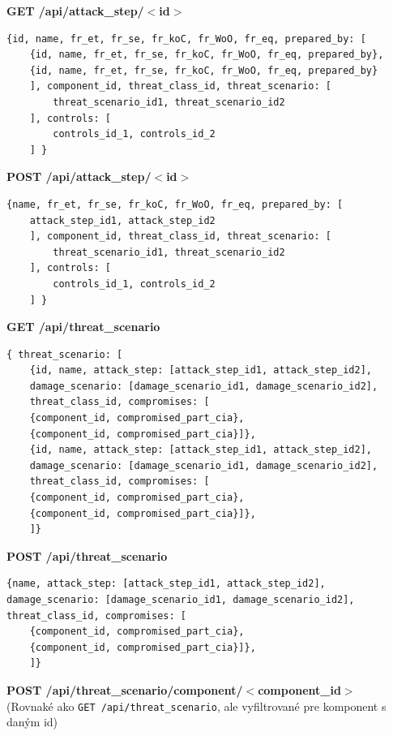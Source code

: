 \documentclass[11pt]{article}
\begin{document}
\vspace{1cm}
\textbf{GET /api/attack\_step/$<$id$>$} 
\begin{verbatim}
{id, name, fr_et, fr_se, fr_koC, fr_WoO, fr_eq, prepared_by: [
	{id, name, fr_et, fr_se, fr_koC, fr_WoO, fr_eq, prepared_by},
	{id, name, fr_et, fr_se, fr_koC, fr_WoO, fr_eq, prepared_by}
	], component_id, threat_class_id, threat_scenario: [
		threat_scenario_id1, threat_scenario_id2
	], controls: [
		controls_id_1, controls_id_2
	] }
\end{verbatim}

\vspace{1cm}
\textbf{POST /api/attack\_step/$<$id$>$} 
\begin{verbatim}
{name, fr_et, fr_se, fr_koC, fr_WoO, fr_eq, prepared_by: [
	attack_step_id1, attack_step_id2
	], component_id, threat_class_id, threat_scenario: [
		threat_scenario_id1, threat_scenario_id2
	], controls: [
		controls_id_1, controls_id_2
	] }
\end{verbatim}

\vspace{1cm}
\textbf{GET /api/threat\_scenario} 
\begin{verbatim}
{ threat_scenario: [
	{id, name, attack_step: [attack_step_id1, attack_step_id2], 
    damage_scenario: [damage_scenario_id1, damage_scenario_id2], 
    threat_class_id, compromises: [
	{component_id, compromised_part_cia},
	{component_id, compromised_part_cia}]},
	{id, name, attack_step: [attack_step_id1, attack_step_id2], 
    damage_scenario: [damage_scenario_id1, damage_scenario_id2], 
    threat_class_id, compromises: [
	{component_id, compromised_part_cia},
	{component_id, compromised_part_cia}]},
	]}
\end{verbatim}

\vspace{1cm}
\textbf{POST /api/threat\_scenario} 
\begin{verbatim}
{name, attack_step: [attack_step_id1, attack_step_id2], 
damage_scenario: [damage_scenario_id1, damage_scenario_id2], 
threat_class_id, compromises: [
	{component_id, compromised_part_cia},
	{component_id, compromised_part_cia}]},
	]}
\end{verbatim}

\vspace{1cm}
\textbf{POST /api/threat\_scenario/component/$<$component\_id$>$}\\
(Rovnaké ako \texttt{GET /api/threat\_scenario}, ale vyfiltrované pre komponent s daným id)
\end{document}
